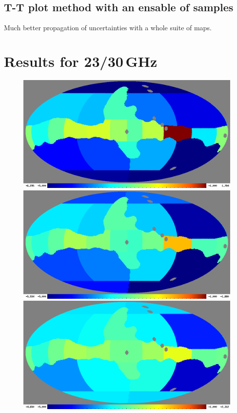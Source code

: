 \documentclass[twocolumn]{../../common/aa}
\begin{document}
\subsection{T-T plot method with an ensable of samples}
\label{sec:ttplot_cosmoglobe}
Much better propagation of uncertainties with a whole suite of maps.


\section{Results for 23/30\,GHz}
\label{sec:results23-30}

\begin{figure}
        \centering
        \includegraphics[width=\linewidth]{figures/wmap23_pl2018_ut_spectral_index_scatter_alphamean_1long.png}
        \includegraphics[width=\linewidth]{figures/wmap23_plnpipe_ut_spectral_index_scatter_alphamean_1long.png}
        \includegraphics[width=\linewidth]{figures/coswmap23_cos30_ut_spectral_index_scatter_alphamean_1long.png}

\end{figure}
\end{document}
